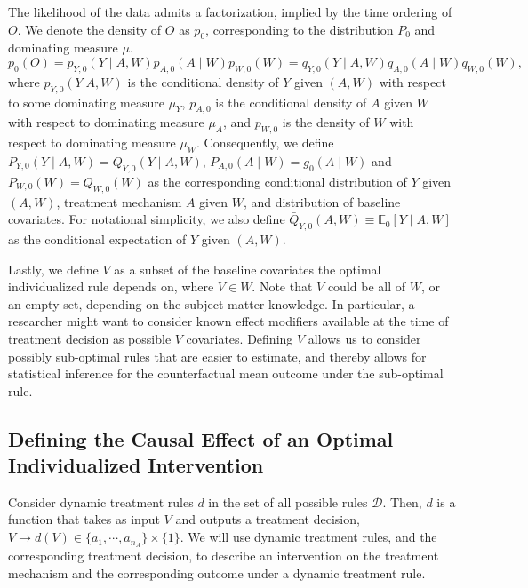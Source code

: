 \documentclass[12pt, krantz2,]{krantz}
\theoremstyle{definition}
\theoremstyle{definition}
\theoremstyle{definition}
\newcommand{\E}{\mathbb{E}}
\newcommand{\1}{\mathbbm{1}}
\begin{document}
The likelihood of the data admits a factorization, implied by the time ordering
of \(O\). We denote the density of \(O\) as \(p_0\), corresponding to the
distribution \(P_0\) and dominating measure \(\mu\).
\begin{equation}
  p_0(O) = p_{Y,0}(Y \mid A,W) p_{A,0}(A \mid W) p_{W,0}(W) =
    q_{Y,0}(Y \mid A,W) q_{A,0}(A \mid W) q_{W,0}(W),
  \label{eq:likelihood-factorization-mopttx}
\end{equation}
where \(p_{Y,0}(Y|A,W)\) is the conditional density of \(Y\) given \((A, W)\) with
respect to some dominating measure \(\mu_Y\), \(p_{A,0}\) is the conditional density
of \(A\) given \(W\) with respect to dominating measure \(\mu_A\), and \(p_{W,0}\) is
the density of \(W\) with respect to dominating measure \(\mu_W\). Consequently, we
define \(P_{Y,0}(Y \mid A, W) = Q_{Y,0}(Y \mid A,W)\), \(P_{A,0}(A \mid W) = g_0(A \mid W)\) and \(P_{W,0}(W)=Q_{W,0}(W)\) as the corresponding conditional
distribution of \(Y\) given \((A,W)\), treatment mechanism \(A\) given \(W\), and
distribution of baseline covariates. For notational simplicity, we also define
\(\bar{Q}_{Y,0}(A,W) \equiv \E_0[Y \mid A,W]\) as the conditional expectation of
\(Y\) given \((A,W)\).

Lastly, we define \(V\) as a subset of the baseline covariates the optimal
individualized rule depends on, where \(V \in W\). Note that \(V\) could be all of
\(W\), or an empty set, depending on the subject matter knowledge. In particular,
a researcher might want to consider known effect modifiers available at the time
of treatment decision as possible \(V\) covariates. Defining \(V\) allows us to
consider possibly sub-optimal rules that are easier to estimate, and thereby
allows for statistical inference for the counterfactual mean outcome under the
sub-optimal rule.

\hypertarget{defining-the-causal-effect-of-an-optimal-individualized-intervention}{%
\subsection{Defining the Causal Effect of an Optimal Individualized Intervention}\label{defining-the-causal-effect-of-an-optimal-individualized-intervention}}

Consider dynamic treatment rules \(d\) in the set of all possible rules
\(\mathcal{D}\). Then, \(d\) is a function that takes as input \(V\) and outputs a
treatment decision, \(V \rightarrow d(V) \in \{a_1, \cdots, a_{n_A} \} \times \{1\}\). We will use dynamic treatment rules, and the corresponding treatment
decision, to describe an intervention on the treatment mechanism and the
corresponding outcome under a dynamic treatment rule.
\end{document}
